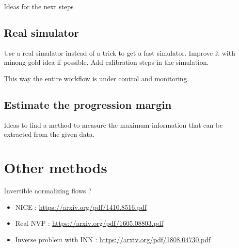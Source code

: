 Ideas for the next steps

\subsection{Real simulator} %
\label{sub:real_simulator}

Use a real simulator instead of a trick to get a fast simulator.
Improve it with minong gold idea if possible.
Add calibration steps in the simulation.

This way the entire workflow is under control and monitoring.



\subsection{Estimate the progression margin} %
\label{sub:estimate_the_progression_margin}

Ideas to find a method to measure the maximum information that can be extracted from the given data.





\section{Other methods} %
\label{sec:other_methods}

Invertible normalizing flows ?
\begin{itemize}
	\item NICE : \url{https://arxiv.org/pdf/1410.8516.pdf}
	\item Real NVP : \url{https://arxiv.org/pdf/1605.08803.pdf}
	\item Inverse problem with INN : \url{https://arxiv.org/pdf/1808.04730.pdf}
\end{itemize}







